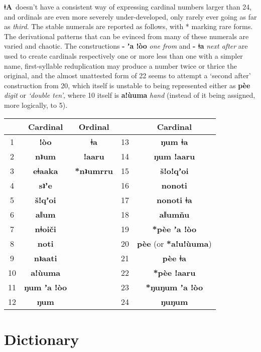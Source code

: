 \documentclass[11pt]{book}
\newcommand{\qcn}[1]{\textbf{#1}}
\newcommand{\langname}{\qcn{ǂA}~}
\newcommand{\transl}[2]{\qcn{#1} \emph{#2}}
\begin{document}
\langname doesn't have a consistent way of expressing cardinal numbers larger than 24, and ordinals are even more severely under-developed, only rarely ever going as far as \emph{third}. The stable numerals are reported as follows, with * marking rare forms. The derivational patterns that can be evinced from many of these numerals are varied and chaotic. The constructions \transl{- ʼa ǃòo}{one from} and \transl{- ǂa}{next after} are used to create cardinals respectively one or more less than one with a simpler name, first-syllable reduplication may produce a number twice or thrice the original, and the almost unattested form of 22 seems to attempt a `second after' construction from 20, which itself is unstable to being represented either as \transl{pèe}{digit} or \emph{`double ten'}, where 10 itself is \transl{aǃùuma}{hand} (instead of it being assigned, more logically, to 5).

\begin{center}

\begin{tabular}{|c|c|c|c|c|}
\hline
& Cardinal & Ordinal & & Cardinal\\ \hline \hline
1 & \qcn{ǃòo} & \qcn{ǂa} & 13 & \qcn{ŋum ǂa} \\ \hline
2 & \qcn{nʇum} & \qcn{ǃaaru} & 14  &  \qcn{ŋum ǃaaru} \\ \hline
3 & \qcn{eǂaaka} & \qcn{*nʇumrru} & 15 & \qcn{šǃoǃqʼoi} \\ \hline
4 & \qcn{sʇʼe} & & 16 & \qcn{nonoti} \\ \hline
5 & \qcn{šǃqʼoi} & & 17 & \qcn{nonoti ǂa} \\ \hline
6 & \qcn{aǁum} & & 18 & \qcn{aǁumňu}  \\ \hline
7 & \qcn{nǂoiči} & & 19 & \qcn{*pèe ʼa ǃòo}\\ \hline
8 & \qcn{noti} && 20 & \qcn{pèe} (or \qcn{*aǃuǃùuma})\\ \hline
9 & \qcn{nʇaati} & & 21 & \qcn{pèe ǂa} \\ \hline
10 & \qcn{aǃùuma} & & 22 & \qcn{*pèe ǃaaru} \\ \hline
11 & \qcn{ŋum ʼa ǃòo} & & 23 & \qcn{*ŋuŋum ʼa ǃòo} \\ \hline
12 & \qcn{ŋum}  & & 24 & \qcn{ŋuŋum} \\ \hline 
\end{tabular}

\end{center}



\section{Dictionary}
\end{document}
